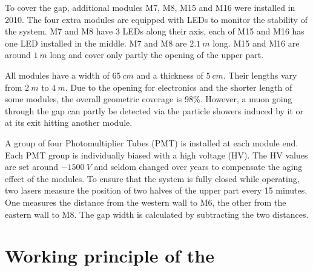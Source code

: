 To cover the gap, additional modules M7, M8, M15 and M16 were installed in 2010. The four extra modules are equipped with LEDs to monitor the stability of the system. M7 and M8 have 3 LEDs along their axis, each of M15 and M16 has one LED installed in the middle. M7 and M8 are $\SI{2.1}{m}$ long. M15 and M16 are around $\SI{1}{m}$ long and cover only partly the opening of the upper part.

All modules have a width of $\SI{65}{cm}$ and a thickness of $\SI{5}{cm}$. Their lengths vary from $\SI{2}{m}$ to $\SI{4}{m}$.
Due to the opening for electronics and the shorter length of some modules, the overall geometric coverage is 98\%. However, a muon going through the gap can partly be detected via the particle showers induced by it or at its exit hitting another module.

A group of four Photomultiplier Tubes (PMT) is installed at each module end. Each PMT group is individually biased with a high voltage (HV). The HV values are set around $\SI{-1500}{V}$ and seldom changed over years to compensate the aging effect of the modules.
To ensure that the system is fully closed while operating, two lasers measure the position of two halves of the upper part every 15 minutes. One measures the distance from the western wall to M6, the other from the eastern wall to M8. The gap width is calculated by subtracting the two distances.


\section{Working principle of the \mvs}
\label{sec:muon-working}


